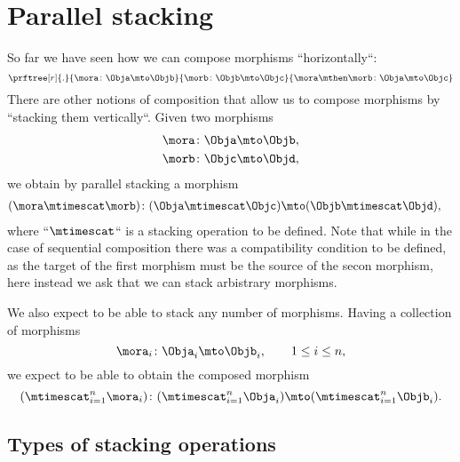 \section{Parallel stacking}


So far we have seen how we can compose morphisms ``horizontally``:
%
\begin{equation}
    \prftree[r]{.}{
        \mora \colon \Obja \mto \Objb
    }{
        \morb\colon \Objb \mto \Objc
    }{
        \mora \mthen \morb \colon \Obja \mto \Objc
    }
\end{equation}
%
There are other notions of composition that allow us to compose morphisms by ``stacking them vertically``.
Given two morphisms
%
\begin{align}
    \mora &\colon \Obja \mto \Objb, \\
    \morb &\colon \Objc \mto \Objd,
\end{align}
%
we obtain by parallel stacking a morphism
%
\begin{align}
    (\mora\mtimescat \morb)  &\colon (\Obja \mtimescat \Objc) \mto (\Objb \mtimescat \Objd),
\end{align}
%
where ``$\mtimescat$`` is a stacking operation to be defined.
Note that while in the case of sequential composition there was a compatibility condition to be defined, as the target of the first morphism must be the source of the secon morphism, here instead we ask that we can stack arbistrary morphisms.

We also expect to be able to stack any number of morphisms. Having a collection of morphisms
%
\begin{equation}
    \mora_i \colon \Obja_i \mto \Objb_i, \qquad 1 \leq i \leq n,
\end{equation}
%
we expect to be able to obtain the composed morphism
%
\begin{equation}
    (\mtimescat_{i=1}^n  \mora_i )\colon( \mtimescat_{i=1}^n  \Obja_i )\mto (\mtimescat_{i=1}^n  \Objb_i).
\end{equation}

\subsection{Types of stacking operations}

